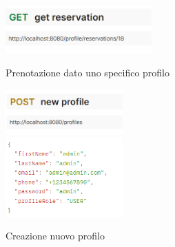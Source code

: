 \begin{figure}[h!]
\includegraphics[width=0.5\textwidth]{Iterazione 2/test/postman/getreservation.PNG}\\
\caption{Prenotazione dato uno specifico profilo}
\end{figure}

\begin{figure}[h!]
\includegraphics[width=0.4\textwidth]{Iterazione 2/test/postman/tnewprofile.PNG}\\
\includegraphics[width=0.4\textwidth]{Iterazione 2/test/postman/newprofile.PNG}\\
\caption{Creazione nuovo profilo}
\end{figure}
